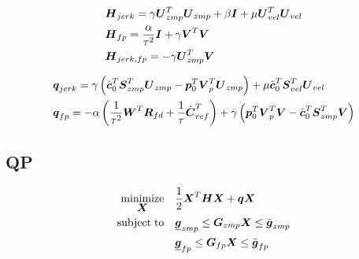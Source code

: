 \begin{equation*}
\begin{split}
& \M{H}_{jerk} = 
    \gamma \M{U}_{zmp}^T \M{U}_{zmp}
    +
    \beta \M{I}
    +
    \mu \M{U}_{vel}^T \M{U}_{vel}\\
& \M{H}_{fp} = 
    \frac{\alpha}{\tau^2} \M{I}
    +
    \gamma \M{V}^T \M{V}\\
& \M{H}_{jerk,fp} = 
    - \gamma \M{U}_{zmp}^T \M{V}
\end{split}
\end{equation*}

\begin{equation*}
\begin{split}
& \V{q}_{jerk} = 
    \gamma 
    \left(
        \cstate_0^T \M{S}_{zmp}^T \M{U}_{zmp}
        - 
        \fp_0^T \M{V}_p^T \M{U}_{zmp} 
    \right)
    +
    \mu \cstate_0^T \M{S}_{vel}^T \M{U}_{vel}\\
& \V{q}_{fp} =
    -
    \alpha 
    \left(
        \frac{1}{\tau^2} \V{W}^T \M{R}_{fd}
        +
        \frac{1}{\tau} \cVel_{ref}^T
    \right)
    +
    \gamma 
    \left(
        \fp_0^T \M{V}_p^T \M{V}
        - 
        \cstate_0^T \M{S}_{zmp}^T \M{V}
    \right)
\end{split}
\end{equation*}


\subsection{QP}
\begin{equation*}
\begin{split}
    \minimize{\V{X}}    & \frac{1}{2} \V{X}^T\M{H}\V{X} + \V{q} \V{X}\\
    \subjectto          & \underline{\V{g}}_{zmp}  \le  \M{G}_{zmp} \V{X}  \le  \bar{\V{g}}_{zmp}\\
                        & \underline{\V{g}}_{fp}  \le  \M{G}_{fp} \V{X}  \le  \bar{\V{g}}_{fp}
\end{split}
\end{equation*}
